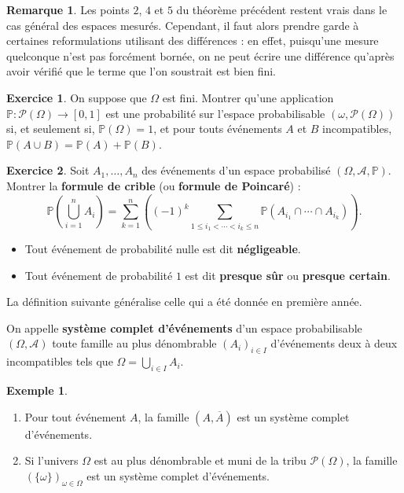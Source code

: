 \documentclass[french]{article}
\renewcommand{\P}{\mathbb{P}}
\theoremstyle{plain}
\theoremstyle{definition}
\newtheorem*{ex}{Exemple}
\newtheorem{exo}{Exercice}
\newtheorem*{rmq}{Remarque}
\theoremstyle{remark}
\begin{document}
\begin{rmq}
	Les points $2$, $4$ et $5$ du théorème précédent restent vrais dans le cas général des espaces mesurés. Cependant, il faut alors prendre garde à certaines reformulations utilisant des différences : en effet, puisqu'une mesure quelconque n'est pas forcément bornée, on ne peut écrire une différence qu'après avoir vérifié que le terme que l'on soustrait est bien fini.
\end{rmq}

\begin{exo}
	On suppose que $\Omega$ est fini. Montrer qu'une application $\P:\mathcal{P}(\Omega)\to[0,1]$ est une probabilité sur l'espace probabilisable $(\omega,\mathcal{P}(\Omega))$ si, et seulement si, $\P(\Omega)=1$, et pour touts événements $A$ et $B$ incompatibles, $\P(A\cup B)=\P(A)+\P(B)$.
\end{exo}

\begin{exo}
	Soit $A_1,\ldots,A_n$ des événements d'un espace probabilisé $(\Omega,\mathcal{A},\P)$. Montrer la \textbf{formule de crible} (ou \textbf{formule de Poincaré}) :
	$$\P\left(\bigcup_{i=1}^nA_i\right)=\sum_{k=1}^{n}\left((-1)^k\sum_{1\leqslant i_1<\cdots<i_k\leqslant n}\P(A_{i_1}\cap\cdots\cap A_{i_k})\right).$$
\end{exo}

\begin{dfn}
	\begin{itemize}
		\item Tout événement de probabilité nulle est dit \textbf{négligeable}.
		\item Tout événement de probabilité $1$ est dit \textbf{presque sûr} ou \textbf{presque certain}.
	\end{itemize}
\end{dfn}

La définition suivante généralise celle qui a été donnée en première année.

\begin{dfn}
	On appelle \textbf{système complet d'événements} d'un espace probabilisable $(\Omega,\mathcal{A})$ toute famille au plus dénombrable $(A_i)_{i\in I}$ d'événements deux à deux incompatibles tels que $\Omega=\displaystyle\bigcup_{i\in I}A_i$. 
\end{dfn}

\begin{ex}
	\begin{enumerate}
		\item Pour tout événement $A$, la famille $(A,\overline{A})$ est un système complet d'événements.
		\item Si l'univers $\Omega$ est au plus dénombrable et muni de la tribu $\mathcal{P}(\Omega)$, la famille $(\{\omega\})_{\omega\in\Omega}$ est un système complet d'événements.
	\end{enumerate}
\end{ex}
\end{document}
